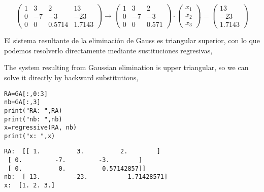 \begin{equation*}
\begin{pmatrix}
1&    3&    2&   13\\
0&   -7&   -3&  -23\\
0&    0&    0.5714&    1.7143
\end{pmatrix}\rightarrow \begin{pmatrix}
1&    3&    2\\
0&   -7&   -3\\
0&    0&    0.571
\end{pmatrix}\cdot \begin{pmatrix}
x_1\\
x_2\\
x_3
\end{pmatrix}=\begin{pmatrix}
13\\
-23\\
1.7143
\end{pmatrix}
\end{equation*}

\begin{paracol}{2}

El sistema resultante de la eliminación de Gauss es triangular superior, con lo que podemos resolverlo directamente mediante sustituciones regresivas,
\switchcolumn

The system resulting from Gaussian elimination is upper triangular, so we can solve it directly by backward substitutions,
\end{paracol}

\begin{verbatim}
RA=GA[:,0:3]
nb=GA[:,3]
print("RA: ",RA)
print("nb: ",nb)
x=regressive(RA, nb)
print("x: ",x)
\end{verbatim}

\begin{verbatim}
RA:  [[ 1.          3.          2.        ]
 [ 0.         -7.         -3.        ]
 [ 0.          0.          0.57142857]]
nb:  [ 13.         -23.           1.71428571]
x:  [1. 2. 3.]
\end{verbatim}

